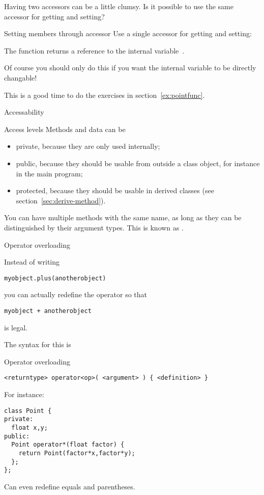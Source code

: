 Having two accessors can be a little clumsy. Is it possible to use the
same accessor for getting and setting?

\begin{block}{Setting members through accessor}
  \label{sl:setmember}
  Use a single accessor for getting and setting:

  The function  returns a reference to the internal
  variable~.
\end{block}

Of course you should only do this if you want the internal variable to
be directly changable!

\begin{exercise}
  This is a good time to do the exercises in section~\ref{ex:pointfunc}.
\end{exercise}

 {Accessability}

\begin{block}{Access levels}
  \label{sl:private-etc}
  Methods and data can be 
  \begin{itemize}
  \item private, because they are only used internally;
  \item public, because they should be usable from outside a class
    object, for instance in the main program;
  \item protected, because they should be usable in derived classes (see
    section~\ref{sec:derive-method}).
  \end{itemize}
\end{block}

You can have multiple methods with the same name, as long as they can
be distinguished by their argument types. This is known as .

 {Operator overloading}
\label{sec:operatordef}

Instead of writing 
\begin{lstlisting}
myobject.plus(anotherobject)
\end{lstlisting}
you can actually redefine the \n{+} operator so that
\begin{lstlisting}
myobject + anotherobject
\end{lstlisting}
is legal.

The syntax for this is
\begin{block}{Operator overloading}
  \label{sl:object-operator}
\begin{lstlisting}
<returntype> operator<op>( <argument> ) { <definition> }
\end{lstlisting}
For instance:
\begin{lstlisting}
class Point {
private:
  float x,y;
public:
  Point operator*(float factor) {
    return Point(factor*x,factor*y);
  };
};
\end{lstlisting}
Can even redefine equals and parentheses.
\end{block}

